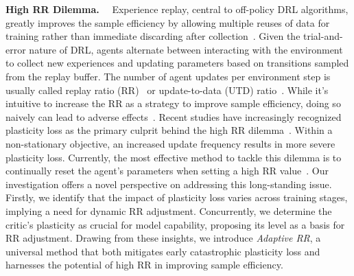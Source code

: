 \textbf{High RR Dilemma.}~~
Experience replay, central to off-policy DRL algorithms, greatly improves the sample efficiency by allowing multiple reuses of data for training rather than immediate discarding after collection~\citep{fedus2020revisiting}.
Given the trial-and-error nature of DRL, agents alternate between interacting with the environment to collect new experiences and updating parameters based on transitions sampled from the replay buffer.
The number of agent updates per environment step is usually called replay ratio (RR)~\citep{fedus2020revisiting, breaking_RR_barrier} or update-to-data (UTD) ratio~\citep{REDQ, smith2022walk}.
While it's intuitive to increase the RR as a strategy to improve sample efficiency, doing so naively can lead to adverse effects~\citep{Regulating_Overfitting, SMR}.
Recent studies have increasingly recognized plasticity loss as the primary culprit behind the high RR dilemma~\citep{dormant_neuron, primacy_bias, Plasticity_Injection}.
Within a non-stationary objective, an increased update frequency results in more severe plasticity loss.
Currently, the most effective method to tackle this dilemma is to continually reset the agent's parameters when setting a high RR value~\citep{breaking_RR_barrier}.
Our investigation offers a novel perspective on addressing this long-standing issue.
Firstly, we identify that the impact of plasticity loss varies across training stages, implying a need for dynamic RR adjustment.
Concurrently, we determine the critic's plasticity as crucial for model capability, proposing its level as a basis for RR adjustment.
Drawing from these insights, we introduce \textit{Adaptive RR}, a universal method that both mitigates early catastrophic plasticity loss and harnesses the potential of high RR in improving sample efficiency.